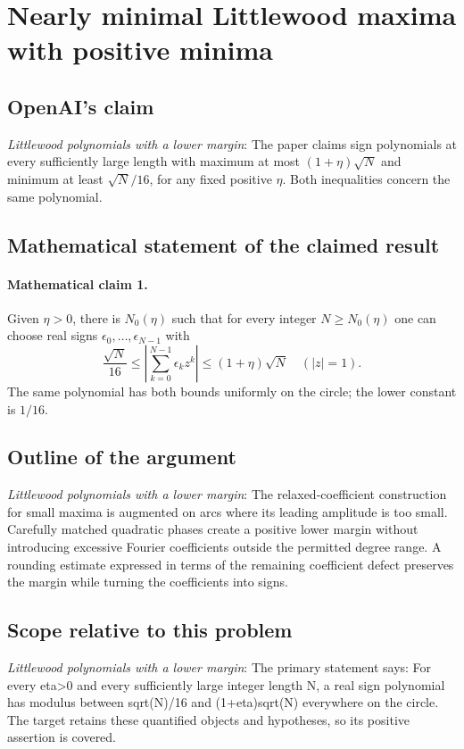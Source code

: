 \documentclass[11pt]{article}
\begin{document}
\section*{Nearly minimal Littlewood maxima with positive minima}

\subsection{OpenAI's claim}
\textit{Littlewood polynomials with a lower margin}: The paper claims sign polynomials at every sufficiently large length with maximum at most $(1+\eta)\sqrt N$ and minimum at least $\sqrt N/16$, for any fixed positive $\eta$. Both inequalities concern the same polynomial.

\subsection{Mathematical statement of the claimed result}
\paragraph{Mathematical claim 1.} Given $\eta>0$, there is $N_0(\eta)$ such that for every integer $N\ge N_0(\eta)$ one can choose real signs $\epsilon_0,\ldots,\epsilon_{N-1}$ with \[\frac{\sqrt N}{16}\le\left|\sum_{k=0}^{N-1}\epsilon_kz^k\right|\le(1+\eta)\sqrt N\quad(|z|=1).\] The same polynomial has both bounds uniformly on the circle; the lower constant is $1/16$.

\subsection{Outline of the argument}
\textit{Littlewood polynomials with a lower margin}: The relaxed-coefficient construction for small maxima is augmented on arcs where its leading amplitude is too small. Carefully matched quadratic phases create a positive lower margin without introducing excessive Fourier coefficients outside the permitted degree range. A rounding estimate expressed in terms of the remaining coefficient defect preserves the margin while turning the coefficients into signs.

\subsection{Scope relative to this problem}
\textit{Littlewood polynomials with a lower margin}: The primary statement says: For every eta>0 and every sufficiently large integer length N, a real sign polynomial has modulus between sqrt(N)/16 and (1+eta)sqrt(N) everywhere on the circle. The target retains these quantified objects and hypotheses, so its positive assertion is covered.
\end{document}
